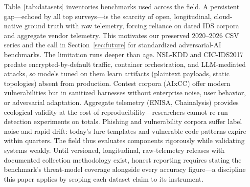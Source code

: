\documentclass[conference,10pt,twocolumn,a4paper]{IEEEtran}
\begin{document}
\begin{table}[t]
\caption{Representative Evaluation Datasets and Benchmarks Referenced.}
\label{tab:datasets}
\centering
\footnotesize
{}
\end{table}
Table~\ref{tab:datasets} inventories benchmarks used across the field. A persistent gap---echoed by all top surveys---is the scarcity of open, longitudinal, cloud-native ground truth with raw telemetry, forcing reliance on dated IDS corpora and aggregate vendor telemetry. This motivates our preserved 2020--2026 CSV series and the call in Section~\ref{sec:future} for standardized adversarial-AI benchmarks. The limitation runs deeper than age. NSL-KDD and CIC-IDS2017 predate encrypted-by-default traffic, container orchestration, and LLM-mediated attacks, so models tuned on them learn artifacts (plaintext payloads, static topologies) absent from production. Contest corpora (AIxCC) offer modern vulnerabilities but in sanitized harnesses without enterprise noise, user behavior, or adversarial adaptation. Aggregate telemetry (ENISA, Chainalysis) provides ecological validity at the cost of reproducibility---researchers cannot re-run detection experiments on totals. Phishing and vulnerability corpora suffer label noise and rapid drift: today's lure templates and vulnerable code patterns expire within quarters. The field thus evaluates components rigorously while validating systems weakly. Until versioned, longitudinal, raw-telemetry releases with documented collection methodology exist, honest reporting requires stating the benchmark's threat-model coverage alongside every accuracy figure---a discipline this paper applies by scoping each dataset claim to its instrument.
\end{document}
